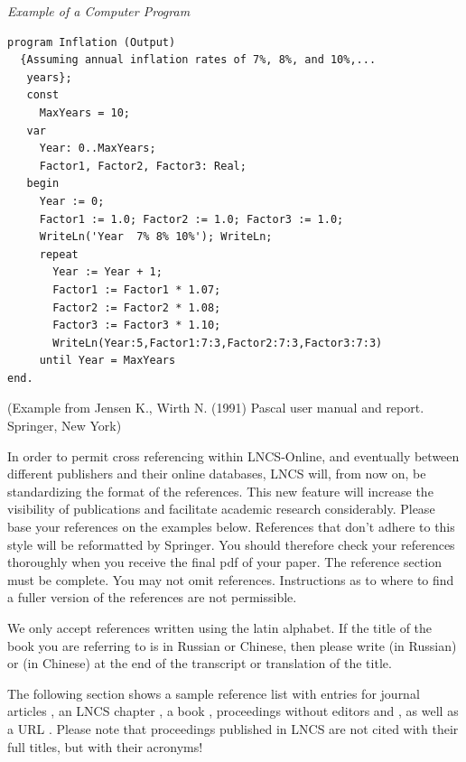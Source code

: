 \documentclass[runningheads,a4paper]{llncs}
\begin{document}
{\it Example of a Computer Program}
\begin{verbatim}
program Inflation (Output)
  {Assuming annual inflation rates of 7%, 8%, and 10%,...
   years};
   const
     MaxYears = 10;
   var
     Year: 0..MaxYears;
     Factor1, Factor2, Factor3: Real;
   begin
     Year := 0;
     Factor1 := 1.0; Factor2 := 1.0; Factor3 := 1.0;
     WriteLn('Year  7% 8% 10%'); WriteLn;
     repeat
       Year := Year + 1;
       Factor1 := Factor1 * 1.07;
       Factor2 := Factor2 * 1.08;
       Factor3 := Factor3 * 1.10;
       WriteLn(Year:5,Factor1:7:3,Factor2:7:3,Factor3:7:3)
     until Year = MaxYears
end.
\end{verbatim}
%
\noindent
{\small (Example from Jensen K., Wirth N. (1991) Pascal user manual and
report. Springer, New York)}


In order to permit cross referencing within LNCS-Online, and eventually
between different publishers and their online databases, LNCS will,
from now on, be standardizing the format of the references. This new
feature will increase the visibility of publications and facilitate
academic research considerably. Please base your references on the
examples below. References that don't adhere to this style will be
reformatted by Springer. You should therefore check your references
thoroughly when you receive the final pdf of your paper.
The reference section must be complete. You may not omit references.
Instructions as to where to find a fuller version of the references are
not permissible.

We only accept references written using the latin alphabet. If the title
of the book you are referring to is in Russian or Chinese, then please write
(in Russian) or (in Chinese) at the end of the transcript or translation
of the title.

The following section shows a sample reference list with entries for
journal articles \cite{jour}, an LNCS chapter \cite{lncschap}, a book
\cite{book}, proceedings without editors \cite{proceeding1} and
\cite{proceeding2}, as well as a URL \cite{url}.
Please note that proceedings published in LNCS are not cited with their
full titles, but with their acronyms!
\end{document}
